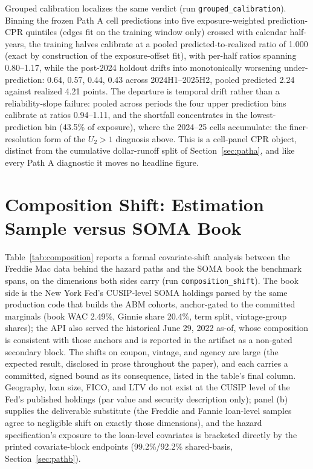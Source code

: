 \documentclass[12pt]{article}
\begin{document}
Grouped calibration localizes the same verdict (run \texttt{grouped\_calibration}). Binning the frozen Path A cell predictions into five exposure-weighted prediction-CPR quintiles (edges fit on the training window only) crossed with calendar half-years, the training halves calibrate at a pooled predicted-to-realized ratio of 1.000 (exact by construction of the exposure-offset fit), with per-half ratios spanning 0.80--1.17, while the post-2024 holdout drifts into monotonically worsening under-prediction: 0.64, 0.57, 0.44, 0.43 across 2024H1--2025H2, pooled predicted 2.24 against realized 4.21 points. The departure is temporal drift rather than a reliability-slope failure: pooled across periods the four upper prediction bins calibrate at ratios 0.94--1.11, and the shortfall concentrates in the lowest-prediction bin (43.5\% of exposure), where the 2024--25 cells accumulate: the finer-resolution form of the $U_2 > 1$ diagnosis above. This is a cell-panel CPR object, distinct from the cumulative dollar-runoff split of Section~\ref{sec:patha}, and like every Path A diagnostic it moves no headline figure.

\section{Composition Shift: Estimation Sample versus SOMA Book}\label{app:composition}

Table~\ref{tab:composition} reports a formal covariate-shift analysis between the Freddie Mac data behind the hazard paths and the SOMA book the benchmark spans, on the dimensions both sides carry (run \texttt{composition\_shift}). The book side is the New York Fed's CUSIP-level SOMA holdings parsed by the same production code that builds the ABM cohorts, anchor-gated to the committed marginals (book WAC 2.49\%, Ginnie share 20.4\%, term split, vintage-group shares); the API also served the historical June 29, 2022 as-of, whose composition is consistent with those anchors and is reported in the artifact as a non-gated secondary block. The shifts on coupon, vintage, and agency are large (the expected result, disclosed in prose throughout the paper), and each carries a committed, signed bound as its consequence, listed in the table's final column. Geography, loan size, FICO, and LTV do not exist at the CUSIP level of the Fed's published holdings (par value and security description only); panel (b) supplies the deliverable substitute (the Freddie and Fannie loan-level samples agree to negligible shift on exactly those dimensions), and the hazard specification's exposure to the loan-level covariates is bracketed directly by the printed covariate-block endpoints (99.2\%/92.2\% shared-basis, Section~\ref{sec:pathb}).
\end{document}
